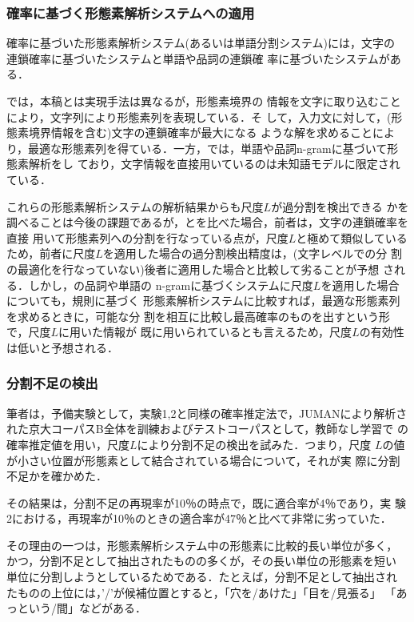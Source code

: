 \subsubsection*{確率に基づく形態素解析システムへの適用}

確率に基づいた形態素解析システム(あるいは単語分割システム)には，文字の
連鎖確率に基づいたシステム\cite{yamamoto97,oda98}と単語や品詞の連鎖確
率に基づいたシステム\cite[など]{nagata94,itoh97,mori98}がある．

\cite{yamamoto97,oda98}では，本稿とは実現手法は異なるが，形態素境界の
情報を文字に取り込むことにより，文字列により形態素列を表現している．そ
して，入力文に対して，(形態素境界情報を含む)文字の連鎖確率が最大になる
ような解を求めることにより，最適な形態素列を得ている．一方，\cite[など]
{nagata94,itoh97,mori98}では，単語や品詞n-gramに基づいて形態素解析をし
ており，文字情報を直接用いているのは未知語モデルに限定されている．

これらの形態素解析システムの解析結果からも尺度$L$が過分割を検出できる
かを調べることは今後の課題であるが，\cite{yamamoto97,oda98}と\cite[な
ど] {nagata94,itoh97,mori98}を比べた場合，前者は，文字の連鎖確率を直接
用いて形態素列への分割を行なっている点が，尺度$L$と極めて類似している
ため，前者に尺度$L$を適用した場合の過分割検出精度は，(文字レベルでの分
割の最適化を行なっていない)後者に適用した場合と比較して劣ることが予想
される．しかし，\cite[など] {nagata94,itoh97,mori98}の品詞や単語の
n-gramに基づくシステムに尺度$L$を適用した場合についても，規則に基づく
形態素解析システムに比較すれば，最適な形態素列を求めるときに，可能な分
割を相互に比較し最高確率のものを出すという形で，尺度$L$に用いた情報が
既に用いられているとも言えるため，尺度$L$の有効性は低いと予想される．

\subsubsection*{分割不足の検出}

筆者は，予備実験として，実験1,2と同様の確率推定法で，JUMANにより解析さ
れた京大コーパスB全体を訓練およびテストコーパスとして，教師なし学習で
の確率推定値を用い，尺度$L$により分割不足の検出を試みた．つまり，尺度
$L$の値が小さい位置が形態素として結合されている場合について，それが実
際に分割不足かを確かめた．

その結果は，分割不足の再現率が10％の時点で，既に適合率が4％であり，実
験2における，再現率が10％のときの適合率が47％と比べて非常に劣っていた．

その理由の一つは，形態素解析システム中の形態素に比較的長い単位が多く，
かつ，分割不足として抽出されたものの多くが，その長い単位の形態素を短い
単位に分割しようとしているためである．たとえば，分割不足として抽出され
たものの上位には，'/'が候補位置とすると，「穴を/あけた」「目を/見張る」
「あっという/間」などがある．

